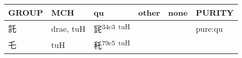 \documentclass[14pt,a4paper]{scrartcl}
\begin{document}
\begin{longtable}[c]{@{}llllll@{}}
\toprule
\begin{minipage}[b]{0.14\columnwidth}\raggedright\strut
GROUP
\strut\end{minipage} &
\begin{minipage}[b]{0.14\columnwidth}\raggedright\strut
MCH
\strut\end{minipage} &
\begin{minipage}[b]{0.14\columnwidth}\raggedright\strut
qu
\strut\end{minipage} &
\begin{minipage}[b]{0.14\columnwidth}\raggedright\strut
other
\strut\end{minipage} &
\begin{minipage}[b]{0.14\columnwidth}\raggedright\strut
none
\strut\end{minipage} &
\begin{minipage}[b]{0.14\columnwidth}\raggedright\strut
PURITY
\strut\end{minipage}\tabularnewline
\midrule
\endhead
\begin{minipage}[t]{0.14\columnwidth}\raggedright\strut
託
\strut\end{minipage} &
\begin{minipage}[t]{0.14\columnwidth}\raggedright\strut
drae, tuH
\strut\end{minipage} &
\begin{minipage}[t]{0.14\columnwidth}\raggedright\strut
㓃\textsuperscript{34c3~tuH}
\strut\end{minipage} &
\begin{minipage}[t]{0.14\columnwidth}\raggedright\strut
\strut\end{minipage} &
\begin{minipage}[t]{0.14\columnwidth}\raggedright\strut
\strut\end{minipage} &
\begin{minipage}[t]{0.14\columnwidth}\raggedright\strut
pure:qu
\strut\end{minipage}\tabularnewline
\begin{minipage}[t]{0.14\columnwidth}\raggedright\strut
乇
\strut\end{minipage} &
\begin{minipage}[t]{0.14\columnwidth}\raggedright\strut
tuH
\strut\end{minipage} &
\begin{minipage}[t]{0.14\columnwidth}\raggedright\strut
秅\textsuperscript{79c5~tuH}
\strut\end{minipage} &

\end{longtable}
\end{document}
